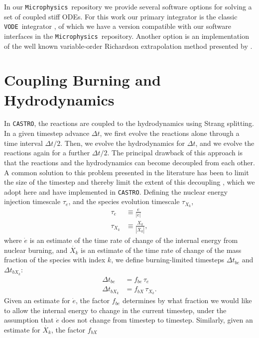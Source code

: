 \documentclass[twocolumn,numberedappendix]{../aastex62}
\newcommand{\castro}{\texttt{CASTRO}}
\newcommand{\microphysics}{\texttt{Microphysics}}
\newcommand{\vode}{\texttt{VODE}}
\begin{document}
In our \microphysics\ repository we provide several software options for
solving a set of coupled stiff ODEs. For this work our primary integrator
is the classic \vode\ integrator \citep{vode}, of which we have a version
compatible with our software interfaces in the \microphysics\ repository.
Another option is an implementation of the well known variable-order Richardson
extrapolation method presented by \citet{stoer:1980}.



\section{Coupling Burning and Hydrodynamics}
\label{sec:hydrocoupling}

In \castro, the reactions are coupled to the hydrodynamics using Strang splitting.
In a given timestep advance $\Delta t$, we first evolve the reactions alone through
a time interval $\Delta t / 2$. Then, we evolve the hydrodynamics for $\Delta t$,
and we evolve the reactions again for a further $\Delta t / 2$. The principal
drawback of this approach is that the reactions and the hydrodynamics can become
decoupled from each other. A common solution to this problem presented in
the literature has been to limit the size of the timestep and thereby limit the
extent of this decoupling \citep{raskin:2010,hawley:2012}, which we adopt here 
and have implemented in \castro. Defining the nuclear energy injection timescale 
$\tau_e$, and the species evolution timescale $\tau_{X_k}$,
\begin{align}
  \tau_e &\equiv \frac{e}{|\dot{e}|} \\
  \tau_{X_k} &\equiv \frac{X_k}{|\dot{X_k}|},
\end{align}
where $\dot{e}$ is an estimate of the time rate of change of the internal energy
from nuclear burning, and $\dot{X_k}$ is an estimate of the time rate of change 
of the mass fraction of the species with index $k$, we define burning-limited 
timesteps $\Delta t_{be}$ and $\Delta t_{bX_k}$:
\begin{align}
  \Delta t_{be} &= f_{be}\, \tau_e \label{eq:timestep_e}\\
  \Delta t_{bX_k} &= f_{bX}\, \tau_{X_k}. \label{eq:timestep_X}
\end{align}
Given an estimate for $\dot{e}$, the factor $f_{be}$ determines by what 
fraction we would like to allow the internal energy to change
in the current timestep, under the assumption that $\dot{e}$ does not change from
timestep to timestep. Similarly, given an estimate for $\dot{X_k}$, the factor $f_{bX}$ 
\end{document}
